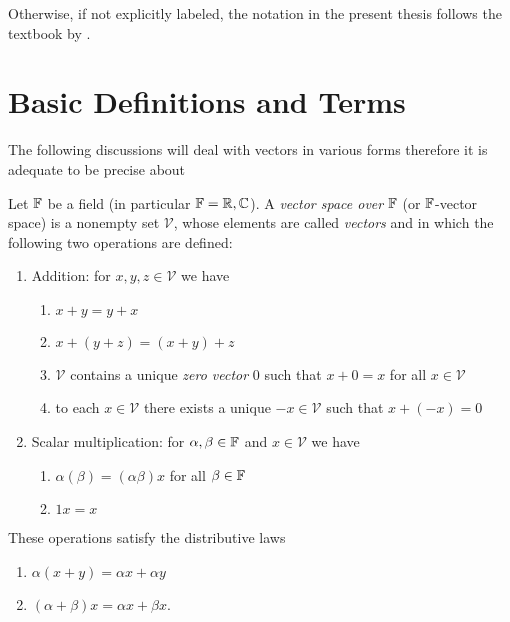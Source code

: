 Otherwise, if not explicitly labeled, the notation in the present thesis
follows the textbook by \textcite{vanBladel2007}.








\section{Basic Definitions and Terms}
\label{sec:basic_definitions_and_terms}

The following discussions will deal with vectors in various forms therefore
it is adequate to be precise about
\begin{definition}
	Let $\mathbb{F}$ be a field (in particular $\mathbb{F} = \mathbb{R},\mathbb{C}$). A \emph{vector space
	over} $\mathbb{F}$ (or $\mathbb{F}$-vector space) is a nonempty set $\mathcal{V}$, whose
	elements are called \emph{vectors} and in which the following two operations
	are defined:
	\begin{enumerate}
		\item Addition: for $x, y, z \in \mathcal{V}$ we have
		\begin{enumerate}[label=(\alph*)]
			\item $x + y = y + x$
			\item $x + \left(y + z\right) = \left(x + y\right) + z$
			\item $\mathcal{V}$ contains a unique \emph{zero vector} $0$ such
			that $x + 0 = x$ for all $x \in \mathcal{V}$
			\item to each $x \in \mathcal{V}$ there exists a unique
			$-x \in \mathcal{V}$ such that $x + \left(-x\right) = 0$
		\end{enumerate}
		\item Scalar multiplication: for $\alpha,\beta \in \mathbb{F}$ and
		$x \in \mathcal{V}$ we have
		\begin{enumerate}[label=(\alph*), start = 5]
			\item $\alpha \left(\beta\right) = \left(\alpha \beta\right) x$ for
			all $\beta \in \mathbb{F}$ 
			\item $1 x = x$
		\end{enumerate}
	\end{enumerate}
	These operations satisfy the distributive laws
	\begin{enumerate}[label=(\alph*), start = 7]
		\item $\alpha \left(x + y\right) = \alpha x + \alpha y$
		\item $\left(\alpha + \beta\right) x = \alpha x + \beta x$.
	\end{enumerate}
\end{definition}

